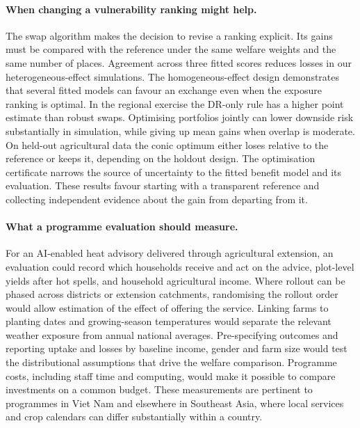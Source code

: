 \paragraph{When changing a vulnerability ranking might help.}
The swap algorithm makes the decision to revise a ranking explicit. Its gains must be
compared with the reference under the same welfare weights and the same number of places.
Agreement across three fitted scores reduces losses in our heterogeneous-effect simulations.
The homogeneous-effect design demonstrates that several fitted models can favour an exchange
even when the exposure ranking is optimal. In the regional exercise the DR-only rule has
a higher point estimate than robust swaps. Optimising portfolios jointly can lower
downside risk substantially in simulation, while giving up mean gains when overlap is
moderate. On held-out agricultural data the conic optimum either loses relative to
the reference or keeps it, depending on the holdout design. The optimisation certificate
narrows the source of uncertainty to the fitted benefit model and its evaluation.
These results favour starting with a transparent reference and collecting independent
evidence about the gain from departing from it.

\paragraph{What a programme evaluation should measure.}
For an AI-enabled heat advisory delivered through agricultural extension, an evaluation could
record which households receive and act on the advice, plot-level yields after hot spells,
and household agricultural income. Where rollout can be phased across districts or extension
catchments, randomising the rollout order would allow estimation of the effect of offering the
service. Linking farms to planting dates and growing-season temperatures would separate the
relevant weather exposure from annual national averages. Pre-specifying outcomes and
reporting uptake and losses by baseline income, gender and farm size would test the
distributional assumptions that drive the welfare comparison. Programme costs, including
staff time and computing, would make it possible to compare investments on a common budget.
These measurements are pertinent to programmes in Viet Nam and elsewhere in Southeast Asia,
where local services and crop calendars can differ substantially within a country.

